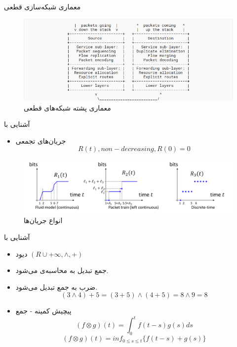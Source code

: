 \documentclass[dvipsnames]{beamer}
\makeatletter
\newcommand{\RTList}{\raggedleft\rightskip\@totalleftmargin}
\makeatother
\begin{document}
\begin{persian}
	\begin{frame}{معماری شبکه‌سازی قطعی}
		\begin{center}\begin{figure}
			\includegraphics[scale=0.4]{images/detnet-stack.png}
			\caption{معماری پشته شبکه‌های قطعی}
		\end{figure}\end{center}
	\end{frame}

	\begin{frame}{آشنایی با }
		\begin{itemize}\RTList{}
			\justifying%
			\item جریان‌های تجمعی
			\[ R(t), non-decreasing, R(0) = 0 \]
		\end{itemize}
		\begin{center}\begin{figure}
			\includegraphics[scale=0.4]{images/flow-models.png}
			\caption{انواع جریان‌ها}
		\end{figure}\end{center}
	\end{frame}

	\begin{frame}{آشنایی با }
		\begin{itemize}\RTList{}
			\justifying%
			\item دیود \((R \cup +\infty, \wedge, +)\)
			\item جمع تبدیل به محاسبه‌ی  می‌شود.
			\item ضرب به جمع تبدیل می‌شود.
			\[ (3\wedge4) + 5 = (3 + 5) \wedge (4 + 5) = 8 \wedge 9 = 8 \]
			\item پیچیش کمینه - جمع
			\[ (f \otimes g)(t) = \int_{0}^{t} f(t-s)g(s)ds \]
			\[ (f \otimes g)(t) = inf_{0 \le s \le t} \{ f(t-s) + g(s) \}\]
		\end{itemize}
	\end{frame}


\end{persian}
\end{document}
